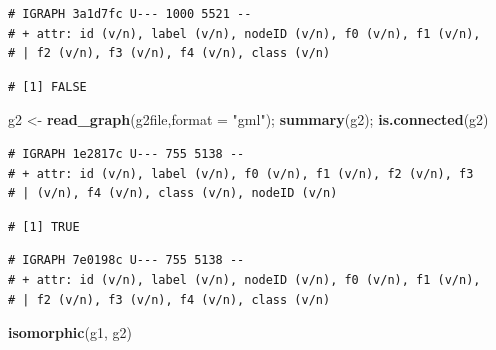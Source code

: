 \documentclass[]{article}
\newenvironment{Shaded}{\begin{snugshade}}{\end{snugshade}}
\newcommand{\KeywordTok}[1]{\textcolor[rgb]{0.13,0.29,0.53}{\textbf{#1}}}
\newcommand{\DataTypeTok}[1]{\textcolor[rgb]{0.13,0.29,0.53}{#1}}
\newcommand{\StringTok}[1]{\textcolor[rgb]{0.31,0.60,0.02}{#1}}
\newcommand{\CommentTok}[1]{\textcolor[rgb]{0.56,0.35,0.01}{\textit{#1}}}
\newcommand{\OperatorTok}[1]{\textcolor[rgb]{0.81,0.36,0.00}{\textbf{#1}}}
\newcommand{\NormalTok}[1]{#1}
\begin{document}
\begin{verbatim}
# IGRAPH 3a1d7fc U--- 1000 5521 -- 
# + attr: id (v/n), label (v/n), nodeID (v/n), f0 (v/n), f1 (v/n),
# | f2 (v/n), f3 (v/n), f4 (v/n), class (v/n)
\end{verbatim}

\begin{verbatim}
# [1] FALSE
\end{verbatim}

\begin{Shaded}
\begin{Highlighting}[]
\NormalTok{g2 <-}\StringTok{ }\KeywordTok{read_graph}\NormalTok{(g2file,}\DataTypeTok{format =} \StringTok{"gml"}\NormalTok{); }\KeywordTok{summary}\NormalTok{(g2); }\KeywordTok{is.connected}\NormalTok{(g2)}
\end{Highlighting}
\end{Shaded}

\begin{verbatim}
# IGRAPH 1e2817c U--- 755 5138 -- 
# + attr: id (v/n), label (v/n), f0 (v/n), f1 (v/n), f2 (v/n), f3
# | (v/n), f4 (v/n), class (v/n), nodeID (v/n)
\end{verbatim}

\begin{verbatim}
# [1] TRUE
\end{verbatim}

\begin{Shaded}
\end{Shaded}

\begin{verbatim}
# IGRAPH 7e0198c U--- 755 5138 -- 
# + attr: id (v/n), label (v/n), nodeID (v/n), f0 (v/n), f1 (v/n),
# | f2 (v/n), f3 (v/n), f4 (v/n), class (v/n)
\end{verbatim}

\begin{Shaded}
\begin{Highlighting}[]
\KeywordTok{isomorphic}\NormalTok{(g1, g2)}
\end{Highlighting}
\end{Shaded}
\end{document}
